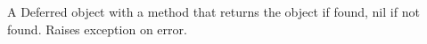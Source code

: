 A Deferred object with a  method that returns the object if found,
nil if not found.  Raises exception on error.

